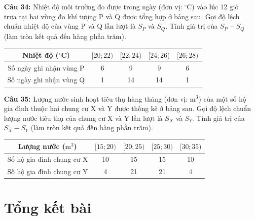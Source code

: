 \documentclass[12pt]{article}
\begin{document}
	\vspace{4mm}
	
	\noindent \textbf{Câu 34:} Nhiệt độ môi trường đo được trong ngày (đơn vị: $^\circ$C) vào lúc 12 giờ trưa tại hai vùng đo khí tượng P và Q được tổng hợp ở bảng sau. Gọi độ lệch chuẩn nhiệt độ của vùng P và Q lần lượt là $S_P$ và $S_Q$. Tính giá trị của $S_P - S_Q$ (làm tròn kết quả đến hàng phần trăm).
	\begin{center}
		\renewcommand{\arraystretch}{1.3}
		\begin{tabular}{|c|c|c|c|c|}
			\hline
			Nhiệt độ ($^\circ$C) & $[20; 22)$ & $[22; 24)$ & $[24; 26)$ & $[26; 28)$ \\
			\hline
			Số ngày ghi nhận vùng P & 6 & 9 & 9 & 6 \\
			\hline
			Số ngày ghi nhận vùng Q & 1 & 14 & 14 & 1 \\
			\hline
		\end{tabular}
	\end{center}
	
	\vspace{4mm}
	
	\noindent \textbf{Câu 35:} Lượng nước sinh hoạt tiêu thụ hàng tháng (đơn vị: $\text{m}^3$) của một số hộ gia đình thuộc hai chung cư X và Y được thống kê ở bảng sau. Gọi độ lệch chuẩn lượng nước tiêu thụ của chung cư X và Y lần lượt là $S_X$ và $S_Y$. Tính giá trị của $S_X - S_Y$ (làm tròn kết quả đến hàng phần trăm).
	\begin{center}
		\renewcommand{\arraystretch}{1.3}
		\begin{tabular}{|c|c|c|c|c|}
			\hline
			Lượng nước ($\text{m}^3$) & $[15; 20)$ & $[20; 25)$ & $[25; 30)$ & $[30; 35)$ \\
			\hline
			Số hộ gia đình chung cư X & 10 & 15 & 15 & 10 \\
			\hline
			Số hộ gia đình chung cư Y & 4 & 21 & 21 & 4 \\
			\hline
		\end{tabular}
	\end{center}
	
	
	\newpage
	\section{Tổng kết bài}
	
\end{document}
